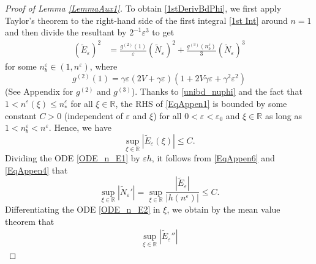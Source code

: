 \documentclass{amsart}
\newcommand{\veps}{\varepsilon}
\numberwithin{equation}{section}
\theoremstyle{plain}%
\theoremstyle{definition}
\theoremstyle{remark}
\theoremstyle{remark}
\begin{document}
\begin{proof}[Proof of Lemma \ref{LemmaAux1}]
To obtain \eqref{1stDerivBdPhi}, we first apply Taylor's theorem to the right-hand side of the first integral \eqref{1st Int} around $n=1$ and then divide the resultant by $2^{-1}\veps^3$ to get
\begin{equation}\label{EqAppen1}
\begin{split}
(\widetilde{E}_\veps)^2 
& = \frac{g^{(2)}(1)}{\veps}(\widetilde{N}_\veps)^2  + \frac{g^{(3)}(n_b^\veps)}{3}(\widetilde{N}_\veps)^3 
\end{split}
\end{equation}
for some $n_b^\veps \in(1, n^\veps)$, where 
\begin{equation}\label{EqAppen3}
g^{(2)}(1) = \gamma\veps(2V+\gamma\veps)(1+2V\gamma\veps+\gamma^2\veps^2)
\end{equation}
(See Appendix for $g^{(2)}$ and $g^{(3)}$). Thanks to \eqref{unibd_nuphi} and the fact that $1<n^\veps(\xi)\leq n_*^\veps$ for all $\xi\in\mathbb{R}$, the RHS of \eqref{EqAppen1} is bounded by some constant $C>0$ (independent of $\veps$ and $\xi$) for all $0<\veps<\veps_0$ and $\xi\in\mathbb{R}$ as long as $1<n_b^\veps <n^\veps$. Hence, we have
\begin{equation}\label{EqAppen6}
\sup_{\xi\in\mathbb{R}}|\widetilde{E}_\veps(\xi)| \leq C.
\end{equation}
Dividing the ODE \eqref{ODE_n_E1} by $\veps h$, it follows from \eqref{EqAppen6} and \eqref{EqAppen4} that 
\begin{equation}\label{EqAppen5}
\sup_{\xi \in \mathbb{R}}|\widetilde{N}_\veps'|=\sup_{\xi \in \mathbb{R}}\frac{|\widetilde{E}_\veps|}{|h(n^\veps)|}  \leq  C.
\end{equation}
Differentiating the ODE \eqref{ODE_n_E2} in $\xi$, we obtain by the mean value theorem that 
\begin{equation}\label{EqAppen8}
\begin{split}
\sup_{\xi \in \mathbb{R}} | \widetilde{E}_\veps'' | 

\end{split}
\end{equation}
\end{proof}
\end{document}
